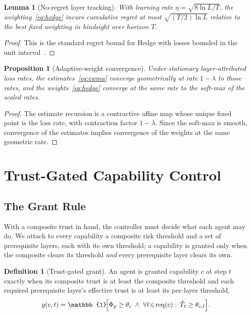 \documentclass[sigconf,anonymous]{acmart}
\theoremstyle{plain}
\newtheorem{lemma}{Lemma}
\newtheorem{proposition}{Proposition}
\theoremstyle{definition}
\newtheorem{definition}{Definition}
\theoremstyle{remark}
\begin{document}
\begin{lemma}[No-regret layer tracking]
\label{lem:regret}
With learning rate $\eta=\sqrt{8\ln L/T}$, the weighting~\eqref{eq:hedge} incurs cumulative
regret at most $\sqrt{(T/2)\ln L}$ relative to the best fixed weighting in hindsight over
horizon $T$.
\end{lemma}
\begin{proof}
This is the standard regret bound for Hedge with losses bounded in the unit
interval~\cite{freund1997decision,cesabianchi2006prediction}.
\end{proof}

\begin{proposition}[Adaptive-weight convergence]
\label{prop:alphaconv}
Under stationary layer-attributed loss rates, the estimates~\eqref{eq:ewma} converge
geometrically at rate $1-\lambda$ to those rates, and the weights~\eqref{eq:hedge}
converge at the same rate to the soft-max of the scaled rates.
\end{proposition}
\begin{proof}
The estimate recursion is a contractive affine map whose unique fixed point is the loss
rate, with contraction factor $1-\lambda$. Since the soft-max is smooth, convergence of the
estimates implies convergence of the weights at the same geometric rate.
\end{proof}

\section{Trust-Gated Capability Control}
\label{sec:tgcc}

\subsection{The Grant Rule}
With a composite trust in hand, the controller must decide what each agent may do. We
attach to every capability a composite risk threshold and a set of prerequisite layers,
each with its own threshold; a capability is granted only when the composite clears its
threshold \emph{and} every prerequisite layer clears its own.

\begin{definition}[Trust-gated grant]
\label{def:grant}
An agent is granted capability $c$ at step $t$ exactly when its composite trust is at least
the composite threshold and each required prerequisite layer's effective trust is at least
its per-layer threshold,
\begin{equation}
g(c,t)=\mathbb{1}\!\Bigl[\Phi_p\ge\theta_c
\;\wedge\;\forall\ell\!\in\!\mathrm{req}(c):\,\tilde T_\ell\ge\theta_{c,\ell}\Bigr].
\label{eq:grant}
\end{equation}
\end{definition}
\end{document}
